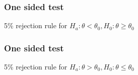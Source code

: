 \documentclass[handout]{beamer}
\begin{document}
   \begin{frame}
   \frametitle{One sided test}
   \begin{center}
   \end{center}
   {\color{blue} 5\% rejection rule} for $H_a: \theta < \theta_0, H_0:\theta \geq \theta_0$
   \end{frame}



   \begin{frame}
   \frametitle{One sided test}
   \begin{center}
   \end{center}
   {\color{blue} 5\% rejection rule} for $H_a: \theta > \theta_0, H_0:\theta \leq \theta_0$
   \end{frame}

\end{document}
